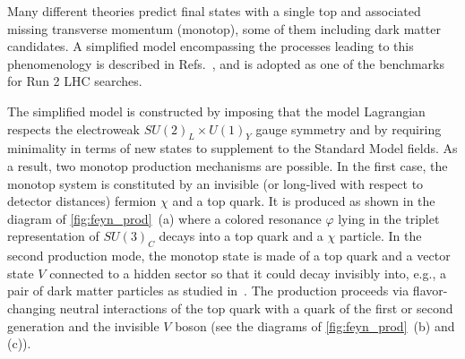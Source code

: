 
Many different theories predict final states with a single top and associated missing 
transverse momentum (monotop), some of them including dark matter candidates. 
A simplified model encompassing the processes leading to this phenomenology is described in Refs.~\cite{AndreaFuksMaltoni,Agram:2013wda,Boucheneb:2014wza},
and is adopted as one of the benchmarks for Run 2 LHC searches. 

The simplified model is constructed by imposing that the model Lagrangian
respects the electroweak $SU(2)_L \times U(1)_Y$ gauge symmetry and by
requiring minimality in terms of new states to supplement to the Standard
Model fields. As a result, two monotop production mechanisms are possible.
In the first case, the monotop system is constituted by an invisible (or
long-lived with respect to detector distances) fermion $\chi$ and a top quark.
It is produced as shown in the diagram of \ref{fig:feyn_prod}~(a) where a colored
resonance $\varphi$ lying in the triplet representation of $SU(3)_C$ decays
into a top quark and a $\chi$ particle. In the second production mode, the
monotop state is made of a top quark and a vector state $V$ connected to a
hidden sector so that it could decay invisibly into, e.g., a pair of dark
matter particles as studied in~\cite{Boucheneb:2014wza}. The production proceeds via
flavor-changing neutral interactions of the top quark with a quark of the
first or second generation and the invisible $V$ boson (see the diagrams of
\ref{fig:feyn_prod}~(b) and (c)).

